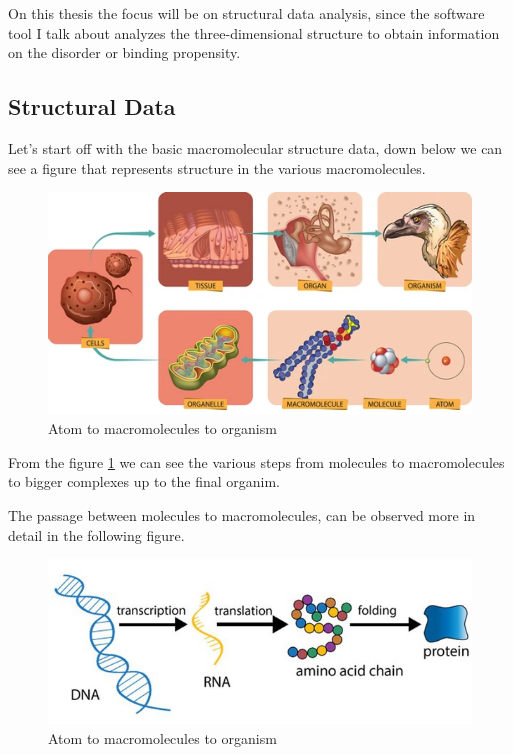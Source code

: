 On this thesis the focus will be on structural data analysis, since the software tool I talk about analyzes the three-dimensional structure to obtain information on the disorder or binding propensity.

\vspace{5em}

\subsection{Structural Data}
Let's start off with the basic macromolecular structure data, down below we can see a figure that represents structure in the various macromolecules.
\pagebreak

\begin{figure}[h!]
    \centering
    \includegraphics{res/proteins_overview/atom_bird.png}
    \caption{Atom to macromolecules to organism}
    \label{fig:atom-bird}
\end{figure}

From the figure \ref{fig:atom-bird} we can see the various steps from molecules to macromolecules to bigger complexes up to the final organim.

The passage between molecules to macromolecules, can be observed more in detail in the following figure.
\begin{figure}[h!]
    \centering
    \includegraphics{res/proteins_overview/dna_protein.png}
    \caption{Atom to macromolecules to organism}
    \label{fig:molecule-protein}
\end{figure}

